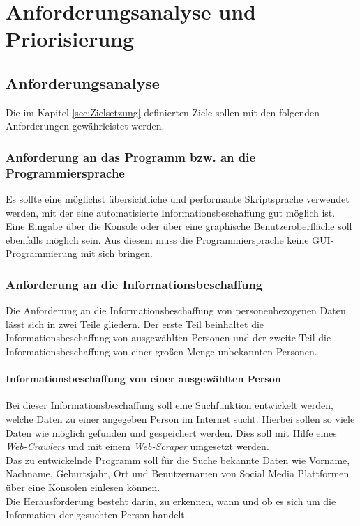 
\chapter{Anforderungsanalyse und Priorisierung}  %
\label{cha:Anforderungsanalyse und Prioriesierung} %
\section{Anforderungsanalyse} %
\label{sec:Anforderunsanalyse} %
Die im Kapitel \ref{sec:Zielsetzung} definierten Ziele sollen mit den folgenden Anforderungen gewährleistet werden.
	\subsection{Anforderung an das Programm bzw. an die Programmiersprache}
	Es sollte eine möglichst übersichtliche und performante Skriptsprache verwendet werden, mit der eine automatisierte Informationsbeschaffung gut möglich ist. Eine Eingabe über die Konsole oder über eine graphische Benutzeroberfläche soll ebenfalls möglich sein. Aus diesem muss die Programmiersprache keine GUI-Programmierung mit sich bringen.
	\subsection{Anforderung an die Informationsbeschaffung}
	Die Anforderung an die Informationsbeschaffung von personenbezogenen Daten lässt sich in zwei Teile gliedern. Der erste Teil beinhaltet die Informationsbeschaffung von ausgewählten Personen und der zweite Teil die Informationsbeschaffung von einer großen Menge unbekannten Personen.
	
		\subsubsection{Informationsbeschaffung von einer ausgewählten Person}
		Bei dieser Informationsbeschaffung soll eine Suchfunktion entwickelt werden, welche Daten zu einer angegeben Person im Internet sucht. Hierbei sollen so viele Daten wie möglich gefunden und gespeichert werden. Dies soll mit Hilfe eines \textit{Web-Crawlers} und mit einem \textit{Web-Scraper} umgesetzt werden.\\
		Das zu entwickelnde Programm soll für die Suche bekannte Daten wie Vorname, Nachname, Geburtsjahr, Ort und Benutzernamen von Social Media Plattformen über eine Konsolen einlesen können.\\
		Die Herausforderung besteht darin, zu erkennen, wann und ob es sich um die Information der gesuchten Person handelt.
	

